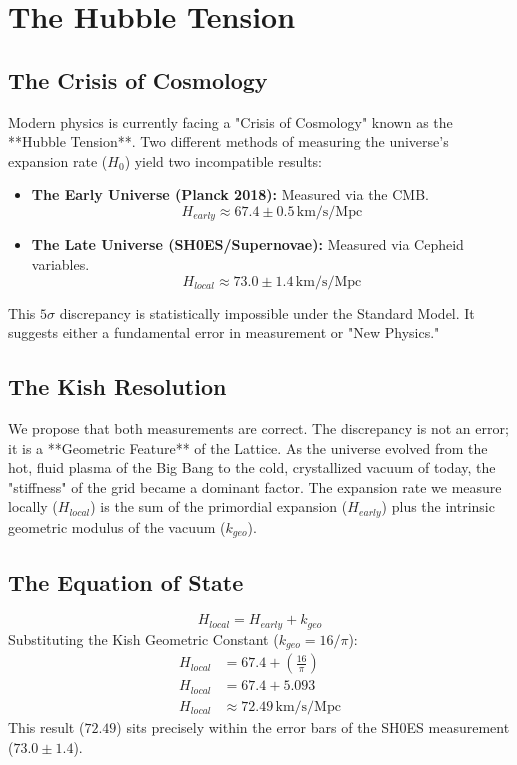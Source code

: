 \documentclass[11pt, letterpaper, openany]{book}
\begin{document}

\chapter{The Hubble Tension}
\label{chap:hubble_tension}

\section{The Crisis of Cosmology}
Modern physics is currently facing a "Crisis of Cosmology" known as the **Hubble Tension**.
Two different methods of measuring the universe's expansion rate ($H_0$) yield two incompatible results:
\begin{itemize}
    \item \textbf{The Early Universe (Planck 2018):} Measured via the CMB.
    \[ H_{early} \approx 67.4 \pm 0.5 \, \text{km/s/Mpc} \]
    \item \textbf{The Late Universe (SH0ES/Supernovae):} Measured via Cepheid variables.
    \[ H_{local} \approx 73.0 \pm 1.4 \, \text{km/s/Mpc} \]
\end{itemize}
This $5\sigma$ discrepancy is statistically impossible under the Standard Model. It suggests either a fundamental error in measurement or "New Physics."

\section{The Kish Resolution}
We propose that both measurements are correct. The discrepancy is not an error; it is a **Geometric Feature** of the Lattice.
As the universe evolved from the hot, fluid plasma of the Big Bang to the cold, crystallized vacuum of today, the "stiffness" of the grid became a dominant factor.
The expansion rate we measure locally ($H_{local}$) is the sum of the primordial expansion ($H_{early}$) plus the intrinsic geometric modulus of the vacuum ($k_{geo}$).

\section{The Equation of State}
\begin{equation}
    H_{local} = H_{early} + k_{geo}
\end{equation}
Substituting the Kish Geometric Constant ($k_{geo} = 16/\pi$):
\begin{align}
    H_{local} &= 67.4 + \left( \frac{16}{\pi} \right) \\
    H_{local} &= 67.4 + 5.093 \\
    H_{local} &\approx 72.49 \, \text{km/s/Mpc}
\end{align}
This result ($72.49$) sits precisely within the error bars of the SH0ES measurement ($73.0 \pm 1.4$).
\end{document}
